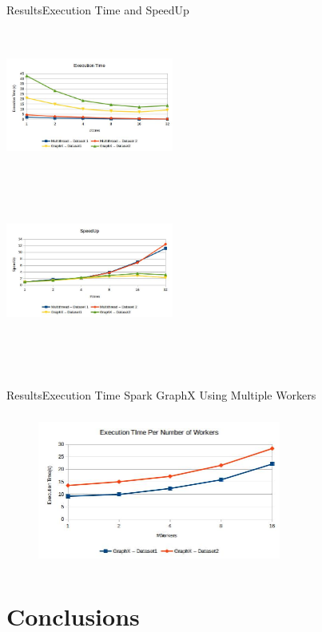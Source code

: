 \documentclass{beamer}
\begin{document}
\begin{frame}{Results}{Execution Time and SpeedUp}
    \begin{minipage}{5.5cm}
        \includegraphics[height=5cm, width=5.5cm]{executionTime_1.jpg}
    \end{minipage}%
    \begin{minipage}{5.5cm}
        \includegraphics[height=5cm, width=5.5cm]{speedUp.jpg}
    \end{minipage}
\
\end{frame}

\begin{frame}{Results}{Execution Time Spark GraphX Using Multiple Workers}
    \begin{figure}
        \includegraphics[height=5cm, width=8cm]{workerTime.jpg}
    \end{figure}
\end{frame}

\section{Conclusions}
\end{document}
